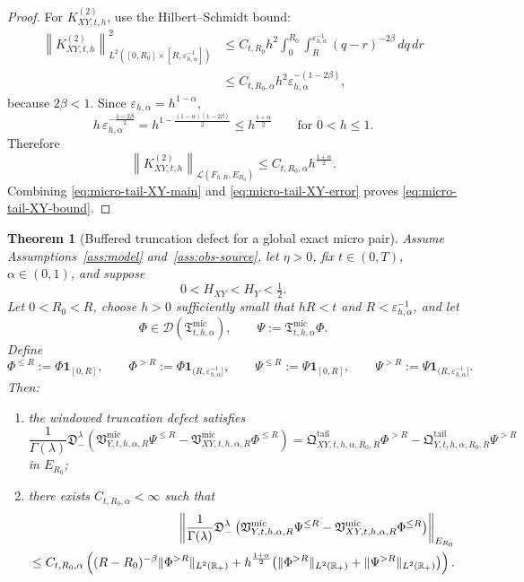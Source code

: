 \documentclass[11pt,a4paper]{amsart}
\theoremstyle{plain}
\newtheorem{theorem}{Theorem}[section]
\theoremstyle{definition}
\theoremstyle{remark}
\newcommand{\R}{\mathbb{R}}
\newcommand{\one}{\mathbf 1}
\begin{document}
\begin{proof}
For \(K_{XY,t,h}^{(2)}\), use the Hilbert--Schmidt bound:
\begin{align*}
\left\|
K_{XY,t,h}^{(2)}
\right\|_{L^2([0,R_0]\times [R,\varepsilon_{h,\alpha}^{-1}])}^2
&\le
C_{t,R_0} h^2
\int_0^{R_0}\int_R^{\varepsilon_{h,\alpha}^{-1}}
(q-r)^{-2\beta}\,dq\,dr \\
&\le
C_{t,R_0,\alpha} h^2\varepsilon_{h,\alpha}^{-(1-2\beta)},
\end{align*}
because \(2\beta<1\). Since \(\varepsilon_{h,\alpha}=h^{1-\alpha}\),
\[
h\,\varepsilon_{h,\alpha}^{-\frac{1-2\beta}{2}}
=
h^{1-\frac{(1-\alpha)(1-2\beta)}{2}}
\le
h^{\frac{1+\alpha}{2}}
\qquad\text{for }0<h\le1.
\]
Therefore
\begin{equation}\label{eq:micro-tail-XY-error}
\left\|
K_{XY,t,h}^{(2)}
\right\|_{\mathcal L(F_{h,R},E_{R_0})}
\le
C_{t,R_0,\alpha}h^{\frac{1+\alpha}{2}}.
\end{equation}
Combining \eqref{eq:micro-tail-XY-main} and \eqref{eq:micro-tail-XY-error} proves
\eqref{eq:micro-tail-XY-bound}.
\end{proof}

\begin{theorem}[Buffered truncation defect for a global exact micro pair]
\label{thm:micro-tail-defect}
Assume Assumptions~\ref{ass:model} and~\ref{ass:obs-source}, let \(\eta>0\), fix \(t\in(0,T)\),
\(\alpha\in(0,1)\), and suppose
\[
0<H_{XY}<H_Y<\tfrac12.
\]
Let \(0<R_0<R\), choose \(h>0\) sufficiently small that \(hR<t\) and
\(R<\varepsilon_{h,\alpha}^{-1}\), and let
\[
\Phi\in\mathcal D(\mathfrak T_{t,h,\alpha}^{\mathrm{mic}}),
\qquad
\Psi:=\mathfrak T_{t,h,\alpha}^{\mathrm{mic}}\Phi.
\]
Define
\[
\Phi^{\le R}:=\Phi\one_{[0,R]},
\qquad
\Phi^{>R}:=\Phi\one_{(R,\varepsilon_{h,\alpha}^{-1}]},
\qquad
\Psi^{\le R}:=\Psi\one_{[0,R]},
\qquad
\Psi^{>R}:=\Psi\one_{(R,\varepsilon_{h,\alpha}^{-1}]}.
\]
Then:
\begin{enumerate}[label=(\roman*)]
\item the windowed truncation defect satisfies
\begin{equation}\label{eq:micro-tail-defect}
\frac{1}{\Gamma(\lambda)}
\mathfrak D_-^\lambda
\left(
\mathfrak V_{Y,t,h,\alpha,R}^{\mathrm{mic}}\Psi^{\le R}
-
\mathfrak V_{XY,t,h,\alpha,R}^{\mathrm{mic}}\Phi^{\le R}
\right)
=
\mathfrak Q_{XY,t,h,\alpha,R_0,R}^{\mathrm{tail}}\Phi^{>R}
-
\mathfrak Q_{Y,t,h,\alpha,R_0,R}^{\mathrm{tail}}\Psi^{>R}
\end{equation}
in \(E_{R_0}\);
\item there exists \(C_{t,R_0,\alpha}<\infty\) such that
\begin{align}
\left\|
\frac{1}{\Gamma(\lambda)}
\mathfrak D_-^\lambda
\left(
\mathfrak V_{Y,t,h,\alpha,R}^{\mathrm{mic}}\Psi^{\le R}
-
\mathfrak V_{XY,t,h,\alpha,R}^{\mathrm{mic}}\Phi^{\le R}
\right)
\right\|_{E_{R_0}}
\notag\\
\le
C_{t,R_0,\alpha}
\left(
(R-R_0)^{-\beta}\|\Phi^{>R}\|_{L^2(\R_+)}
+h^{\frac{1+\alpha}{2}}
\bigl(
\|\Phi^{>R}\|_{L^2(\R_+)}+\|\Psi^{>R}\|_{L^2(\R_+)}
\bigr)
\right).
\label{eq:micro-tail-defect-bound}
\end{align}
\end{enumerate}
\end{theorem}
\end{document}
